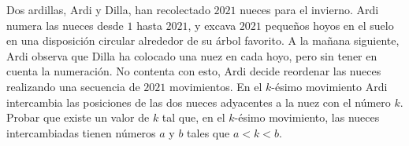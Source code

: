 Dos ardillas, Ardi y Dilla, han recolectado $2021$ nueces para el invierno. Ardi numera las nueces desde $1$ hasta $2021$, y excava $2021$ pequeños hoyos en el suelo en una disposición circular alrededor de su árbol favorito. A la mañana siguiente, Ardi observa que Dilla ha colocado una nuez en cada hoyo, pero sin tener en cuenta la numeración. No contenta con esto, Ardi decide reordenar las nueces realizando una secuencia de $2021$ movimientos. En el $k$-ésimo movimiento Ardi intercambia las posiciones de las dos nueces adyacentes a la nuez con el número $k$. Probar que existe un valor de $k$ tal que, en el $k$-ésimo movimiento, las nueces intercambiadas tienen números $a$ y $b$ tales que $a \lt k \lt b$.